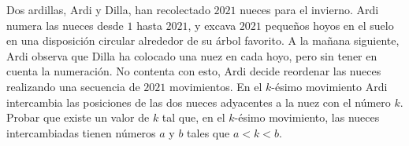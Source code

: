 Dos ardillas, Ardi y Dilla, han recolectado $2021$ nueces para el invierno. Ardi numera las nueces desde $1$ hasta $2021$, y excava $2021$ pequeños hoyos en el suelo en una disposición circular alrededor de su árbol favorito. A la mañana siguiente, Ardi observa que Dilla ha colocado una nuez en cada hoyo, pero sin tener en cuenta la numeración. No contenta con esto, Ardi decide reordenar las nueces realizando una secuencia de $2021$ movimientos. En el $k$-ésimo movimiento Ardi intercambia las posiciones de las dos nueces adyacentes a la nuez con el número $k$. Probar que existe un valor de $k$ tal que, en el $k$-ésimo movimiento, las nueces intercambiadas tienen números $a$ y $b$ tales que $a \lt k \lt b$.